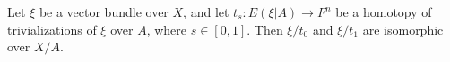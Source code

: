 Let $\xi$ be a vector bundle over $X$, and let $t_s: E(\xi|A) \rightarrow F^n$ be a homotopy of trivializations of $\xi$ over $A$, where $s \in [0,1]$. Then $\xi/t_0$ and $\xi/t_1$ are isomorphic over $X/A$.
